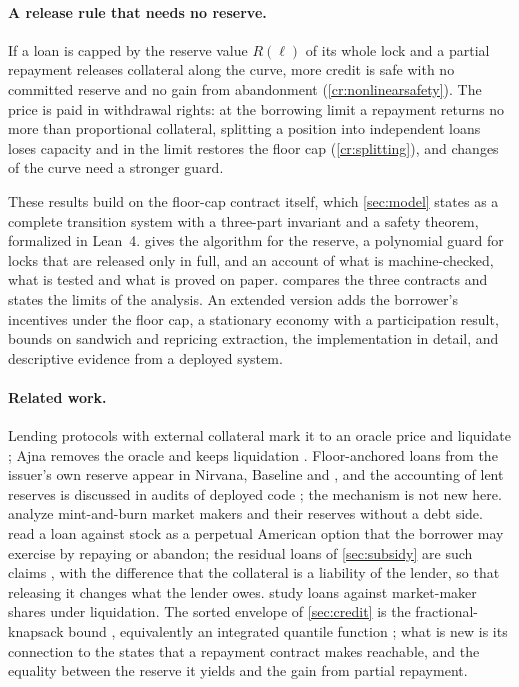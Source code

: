 \documentclass[11pt,a4paper]{article}
\theoremstyle{plain}
\theoremstyle{definition}
\theoremstyle{remark}
\newcommand{\vone}{\citep{dabc2026}}
\begin{document}
\paragraph{A release rule that needs no reserve.} If a loan is capped by the reserve value $R(\ell)$ of its whole lock and a partial repayment releases collateral along the curve, more credit is safe with no committed reserve and no gain from abandonment (\cref{cr:nonlinearsafety}). The price is paid in withdrawal rights: at the borrowing limit a repayment returns no more than proportional collateral, splitting a position into independent loans loses capacity and in the limit restores the floor cap (\cref{cr:splitting}), and changes of the curve need a stronger guard.

\medskip
These results build on the floor-cap contract itself, which \cref{sec:model} states as a complete transition system with a three-part invariant and a safety theorem, formalized in Lean~4.  gives the algorithm for the reserve, a polynomial guard for locks that are released only in full, and an account of what is machine-checked, what is tested and what is proved on paper.  compares the three contracts and states the limits of the analysis. An extended version \citep{extended} adds the borrower's incentives under the floor cap, a stationary economy with a participation result, bounds on sandwich and repricing extraction, the implementation in detail, and descriptive evidence from a deployed system.

\paragraph{Related work.} Lending protocols with external collateral mark it to an oracle price and liquidate \citep{bartoletti2021,werner2022sok}; Ajna removes the oracle and keeps liquidation \citep{ajna}. Floor-anchored loans from the issuer's own reserve appear in Nirvana, Baseline and \vone, and the accounting of lent reserves is discussed in audits of deployed code \citep{guardianbaseline}; the mechanism is not new here.  analyze mint-and-burn market makers and their reserves without a debt side.  read a loan against stock as a perpetual American option that the borrower may exercise by repaying or abandon; the residual loans of \cref{sec:subsidy} are such claims \citep{merton1974}, with the difference that the collateral is a liability of the lender, so that releasing it changes what the lender owes.  study loans against market-maker shares under liquidation. The sorted envelope of \cref{sec:credit} is the fractional-knapsack bound \citep{kellerer2004}, equivalently an integrated quantile function \citep{gushchin2017}; what is new is its connection to the states that a repayment contract makes reachable, and the equality between the reserve it yields and the gain from partial repayment.












\end{document}
